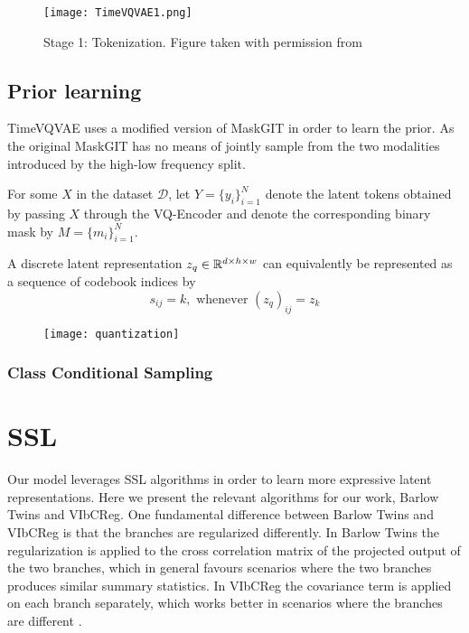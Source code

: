 \documentclass[../../thesis.tex]{subfiles}
\begin{document}
\begin{figure}[h]
    \texttt{[image: TimeVQVAE1.png]}
    \centering 
    \label{fig:TimeVQVAE1}
    \caption{Stage 1: Tokenization. Figure taken with permission from \cite{TimeVQVAE}}
\end{figure}



\subsection{Prior learning}

TimeVQVAE uses a modified version of MaskGIT in order to learn the prior. As the original MaskGIT has no means of jointly sample from the two modalities introduced by the high-low frequency split. \newline

For some  $X$ in the dataset $\mathcal{D}$, let $Y = \{y_i\}_{i=1}^N$ denote the latent tokens obtained by passing $X$ through the VQ-Encoder and denote the corresponding binary mask by $M = \{m_i\}_{i=1}^N$.\newline

A discrete latent representation $z_q \in \mathbb{R}^{d\times h\times w}$ can equivalently be represented as a sequence of codebook indices by 
\begin{equation}
    s_{ij} = k, \text{ whenever } (z_q)_{ij} = z_k
\end{equation}

\begin{figure}[h]
    \texttt{[image: quantization]}
    \centering    
\end{figure}



\subsubsection{Class Conditional Sampling}



\section{SSL}

Our model leverages SSL algorithms in order to learn more expressive latent representations. Here we present the relevant algorithms for our work, Barlow Twins and VIbCReg.
\newline
One fundamental difference between Barlow Twins and VIbCReg is that the branches are regularized differently. In Barlow Twins the regularization is applied to the cross correlation matrix of the projected output of the two branches, which in general favours scenarios where the two branches produces similar summary statistics. In VIbCReg the covariance term is applied on each branch separately, which works better in scenarios where the branches are different \cite{bardes2022vicreg}.
\end{document}
